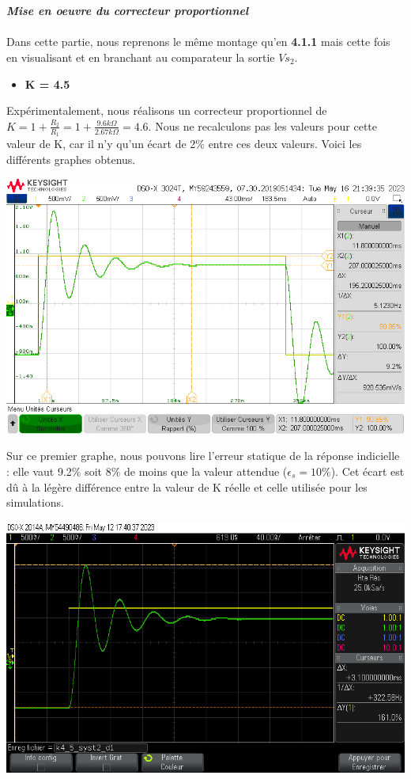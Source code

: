 \documentclass[12pt]{article}
\begin{document}
\\\\\Large \textit{\textbf{Mise en oeuvre du correcteur proportionnel}}
\\\\\normalsize Dans cette partie, nous reprenons le même montage qu'en \textbf{4.1.1} mais cette fois en visualisant et en branchant au comparateur la sortie $Vs_2$.
\begin{itemize}
    \item \bf \large K = 4.5
\end{itemize}
Expérimentalement, nous réalisons un correcteur proportionnel de $K = 1 + \frac{R_2}{R_1} = 1 + \frac{9.6 k\Omega}{2.67 k\Omega} = 4.6$. Nous ne recalculons pas les valeurs pour cette valeur de K, car il n'y qu'un écart de 2$\%$ entre ces deux valeurs.
Voici les différents graphes obtenus.
\begin{center}
    \includegraphics[width = 16 cm]{TP3/Syst_2/P/estat-syst2-k4,5.png}
\end{center}
Sur ce premier graphe, nous pouvons lire l'erreur statique de la réponse indicielle : elle vaut 9.2$\%$ soit 8$\%$ de moins que la valeur attendue ($\epsilon_s = 10\%$). Cet écart est dû à la légère différence entre la valeur de K réelle et celle utilisée pour les simulations.
\begin{center}
    \includegraphics[width = 16 cm]{TP3/Syst_2/P/k4_5_syst2_d1.png}
\end{center}
\end{document}

